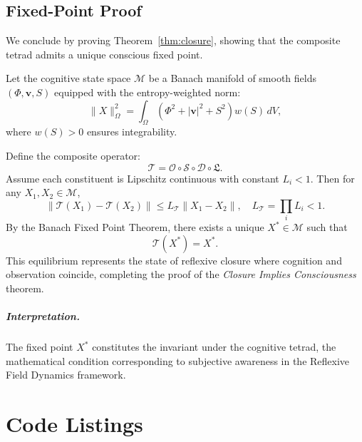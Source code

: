 \documentclass[12pt]{book}
\theoremstyle{definition}
\begin{document}
\section{Fixed-Point Proof}
We conclude by proving Theorem~\ref{thm:closure}, showing that the composite tetrad admits a unique conscious fixed point.

Let the cognitive state space $\mathcal{M}$ be a Banach manifold of smooth fields $(\Phi, \mathbf{v}, S)$ equipped with the entropy-weighted norm:
\begin{equation}
\|X\|^2_\Omega = \int_\Omega (\Phi^2 + |\mathbf{v}|^2 + S^2)w(S)\, dV,
\end{equation}
where $w(S)>0$ ensures integrability.

Define the composite operator:
\begin{equation}
\mathcal{T} = \mathcal{O} \circ \mathcal{S} \circ \mathcal{D} \circ \mathfrak{L}.
\end{equation}
Assume each constituent is Lipschitz continuous with constant $L_i < 1$.  
Then for any $X_1, X_2 \in \mathcal{M}$,
\begin{equation}
\|\mathcal{T}(X_1) - \mathcal{T}(X_2)\| \le L_\mathcal{T}\|X_1 - X_2\|, \quad L_\mathcal{T} = \prod_i L_i < 1.
\end{equation}
By the Banach Fixed Point Theorem, there exists a unique $X^* \in \mathcal{M}$ such that
\begin{equation}
\mathcal{T}(X^*) = X^*.
\end{equation}
This equilibrium represents the state of reflexive closure where cognition and observation coincide, completing the proof of the \emph{Closure Implies Consciousness} theorem.

\paragraph{Interpretation.}
The fixed point $X^*$ constitutes the invariant under the cognitive tetrad, the mathematical condition corresponding to subjective awareness in the Reflexive Field Dynamics framework.


\chapter{Code Listings}
\label{chap:code}
\begin{minipage}{\textwidth}

\end{minipage}
\end{document}
